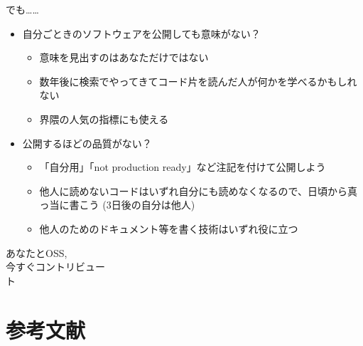 \documentclass[
        unicode%
    ]{beamer}
\begin{document}
\begin{frame}{でも……}
    \begin{itemize}
        \pause
        \item 自分ごときのソフトウェアを公開しても意味がない？
            \begin{itemize}
                \pause
                \item 意味を見出すのはあなただけではない
                \item 数年後に検索でやってきてコード片を読んだ人が何かを学べるかもしれない
                \item 界隈の人気の指標にも使える
            \end{itemize}
        \pause
        \item 公開するほどの品質がない？
            \begin{itemize}
                \pause
                \item 「自分用」「not production ready」など注記を付けて公開しよう
                \item 他人に読めないコードはいずれ自分にも読めなくなるので、日頃から真っ当に書こう (3日後の自分は他人)
                \item 他人のためのドキュメント等を書く技術はいずれ役に立つ
            \end{itemize}
    \end{itemize}
\end{frame}

\begin{frame}{}
    \phantom{}
    {\Large\centering
        あなたとOSS,\\
        今すぐコントリビュー\\
        ト\\
    }
\end{frame}

\section*{参考文献}
\end{document}
